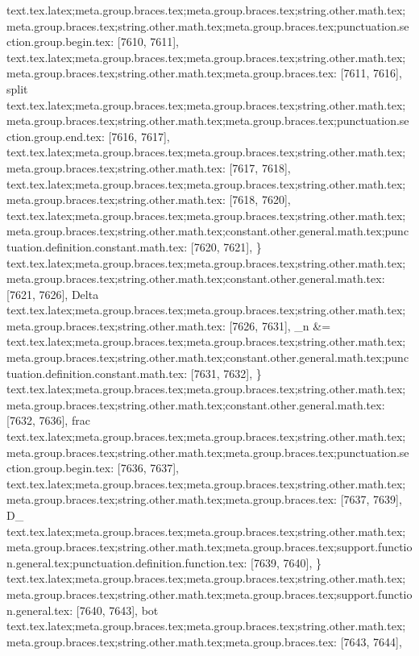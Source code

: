 {{{{{{{{{{{{{{{{{{{{{{{{{{{{{{{{{{{{{{{{{{{{{{{{{{{{{{{{{{{{{{{{{{{{{{{{{{{{{{{{{{{{{{{{{{{{{{{{{{{{{{{{{{{{{{{{{{{{{{{{{{{{{{{{{{{{{{{{{{{{{{{{{{{{{{{{{{{{{{{{{{{{{{{{{{{{{{{{{{{{{{{{{{{{{{{{{{{{{{{{{{{{{{{{text.tex.latex;meta.group.braces.tex;meta.group.braces.tex;string.other.math.tex;meta.group.braces.tex;string.other.math.tex;meta.group.braces.tex;punctuation.section.group.begin.tex: [7610, 7611], {{}
text.tex.latex;meta.group.braces.tex;meta.group.braces.tex;string.other.math.tex;meta.group.braces.tex;string.other.math.tex;meta.group.braces.tex: [7611, 7616], {split}
text.tex.latex;meta.group.braces.tex;meta.group.braces.tex;string.other.math.tex;meta.group.braces.tex;string.other.math.tex;meta.group.braces.tex;punctuation.section.group.end.tex: [7616, 7617], {}}
text.tex.latex;meta.group.braces.tex;meta.group.braces.tex;string.other.math.tex;meta.group.braces.tex;string.other.math.tex: [7617, 7618], {
}
text.tex.latex;meta.group.braces.tex;meta.group.braces.tex;string.other.math.tex;meta.group.braces.tex;string.other.math.tex: [7618, 7620], {  }
text.tex.latex;meta.group.braces.tex;meta.group.braces.tex;string.other.math.tex;meta.group.braces.tex;string.other.math.tex;constant.other.general.math.tex;punctuation.definition.constant.math.tex: [7620, 7621], {\}
text.tex.latex;meta.group.braces.tex;meta.group.braces.tex;string.other.math.tex;meta.group.braces.tex;string.other.math.tex;constant.other.general.math.tex: [7621, 7626], {Delta}
text.tex.latex;meta.group.braces.tex;meta.group.braces.tex;string.other.math.tex;meta.group.braces.tex;string.other.math.tex: [7626, 7631], {_n &=}
text.tex.latex;meta.group.braces.tex;meta.group.braces.tex;string.other.math.tex;meta.group.braces.tex;string.other.math.tex;constant.other.general.math.tex;punctuation.definition.constant.math.tex: [7631, 7632], {\}
text.tex.latex;meta.group.braces.tex;meta.group.braces.tex;string.other.math.tex;meta.group.braces.tex;string.other.math.tex;constant.other.general.math.tex: [7632, 7636], {frac}
text.tex.latex;meta.group.braces.tex;meta.group.braces.tex;string.other.math.tex;meta.group.braces.tex;string.other.math.tex;meta.group.braces.tex;punctuation.section.group.begin.tex: [7636, 7637], {{}
text.tex.latex;meta.group.braces.tex;meta.group.braces.tex;string.other.math.tex;meta.group.braces.tex;string.other.math.tex;meta.group.braces.tex: [7637, 7639], {D_}
text.tex.latex;meta.group.braces.tex;meta.group.braces.tex;string.other.math.tex;meta.group.braces.tex;string.other.math.tex;meta.group.braces.tex;support.function.general.tex;punctuation.definition.function.tex: [7639, 7640], {\}
text.tex.latex;meta.group.braces.tex;meta.group.braces.tex;string.other.math.tex;meta.group.braces.tex;string.other.math.tex;meta.group.braces.tex;support.function.general.tex: [7640, 7643], {bot}
text.tex.latex;meta.group.braces.tex;meta.group.braces.tex;string.other.math.tex;meta.group.braces.tex;string.other.math.tex;meta.group.braces.tex: [7643, 7644], { }
}}}}}}}}}}}}}}}}}}}}}}}}}}}}}}}}}}}}}}}}}}}}}}}}}}}}}}}}}}}}}}}}}}}}}}}}}}}}}}}}}}}}}}}}}}}}}}}}}}}}}}}}}}}}}}}}}}}}}}}}}}}}}}}}}}}}}}}}}}}}}}}}}}}}}}}}}}}}}}}}}}}}}}}}}}}}}}}}}}}}}}}}}}}}}}}}}}}}}}}}}}}}}}}}}}}}
